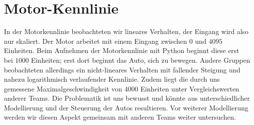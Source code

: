 \documentclass[10pt]{article}
\begin{document}
\section{Motor-Kennlinie} %
\label{sec:motor_kennlinie}
In der Motorkennlinie beobachteten wir lineares Verhalten, der Eingang wird also nur skaliert.
Der Motor arbeitet mit einem Eingang zwischen $0$ und $4095$ Einheiten.
Beim Aufnehmen der Motorkennlinie mit Python beginnt diese erst bei $1000$ Einheiten;
erst dort beginnt das Auto, sich zu bewegen.
Andere Gruppen beobachteten allerdings ein nicht-lineares Verhalten mit fallender Steigung und nahezu logarithmisch verlaufender Kennlinie.
Zudem liegt die durch uns gemessene Maximalgeschwindigkeit von $4000$ Einheiten unter Vergleichswerten anderer Teams.
Die Problematik ist uns bewusst und könnte aus unterschiedlicher Modellierung und der Steuerung der Autos resultieren.
Vor weiterer Modellierung werden wir diesen Aspekt gemeinsam mit anderen Teams weiter untersuchen.

\end{document}
